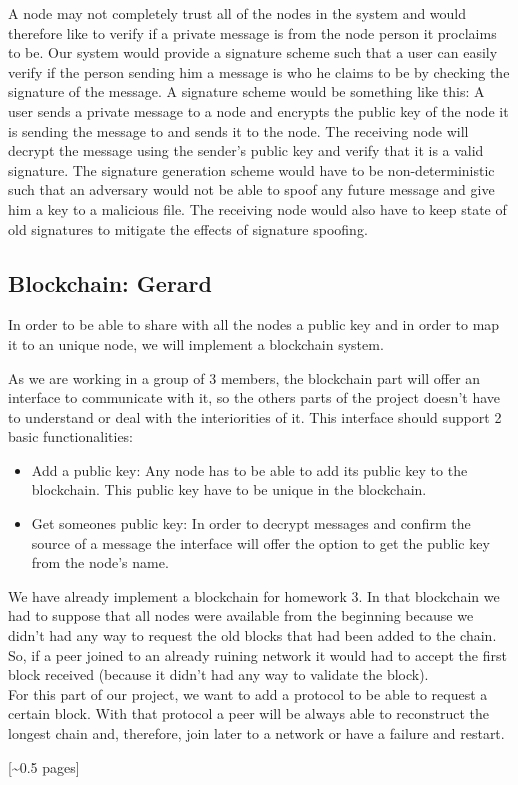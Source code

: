 \documentclass[12pt,a4paper,draft]{article}
\begin{document}
A node may not completely trust all of the nodes in the system and would therefore like to verify if a private message is from the node person it proclaims to be. Our system would provide a signature scheme such that a user can easily verify if the person sending him a message is who he claims to be by checking the signature of the message. A signature scheme would be something like this: A user sends a private message to a node and encrypts the public key of the node it is sending the message to and sends it to the node. The receiving node will decrypt the message using the sender’s  public key and verify that it is a valid signature. The signature generation scheme would have to be non-deterministic such that an adversary would not be able to spoof any future message and give him a key to a malicious file. The receiving node would also have to keep state of old signatures to mitigate the effects of signature spoofing.

\subsection{Blockchain: Gerard}

In order to be able to share with all the nodes a public key and in order to map it to an unique node, we will implement a blockchain system.

As we are working in a group of 3 members, the blockchain part will offer an interface to communicate with it, so the others parts of the project doesn't have to understand or deal with the interiorities of it. This interface should support 2 basic functionalities:

\begin{itemize}
 \item Add a public key: Any node has to be able to add its public key to the blockchain. This public key have to be unique in the blockchain.

 \item Get someones public key: In order to decrypt messages and confirm the source of a message the interface will offer the option to get the public key from the node's name.
\end{itemize}

We have already implement a blockchain for homework 3. In that blockchain we had to suppose that all nodes were available from the beginning because we didn't had any way to request the old blocks that had been added to the chain.
So, if a peer joined to an already ruining network it would had to accept the first block received (because it didn't had any way to validate the block). \\


For this part of our project, we want to add a protocol to be able to request a certain block. With that protocol a peer will be always able to reconstruct the longest chain and, therefore, join later to a network or have a failure and restart.

[\textasciitilde{}0.5 pages]
\end{document}

